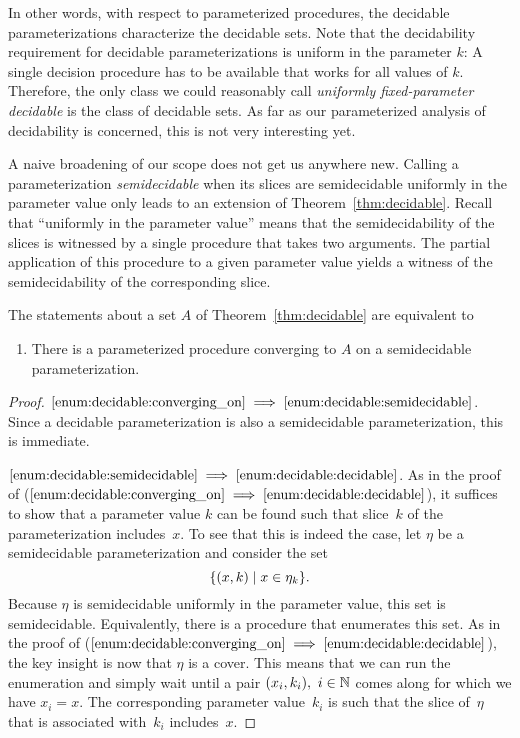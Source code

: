 In other words, with respect to parameterized procedures, the decidable parameterizations characterize the decidable sets.
Note that the decidability requirement for decidable parameterizations is uniform in the parameter $k$:
A single decision procedure has to be available that works for all values of $k$.
Therefore, the only class we could reasonably call \emph{uniformly fixed-parameter decidable} is the class of decidable sets.
As far as our parameterized analysis of decidability is concerned, this is not very interesting yet.

A naive broadening of our scope does not get us anywhere new.
Calling a parameterization \emph{semidecidable} when its slices are semidecidable uniformly in the parameter value only leads to an extension of Theorem~\ref{thm:decidable}.
Recall that \enquote{uniformly in the parameter value} means that the semidecidability of the slices is witnessed by a single procedure that takes two arguments.
The partial application of this procedure to a given parameter value yields a witness of the semidecidability of the corresponding slice.
\begin{theorem}
  The statements about a set $A$ of Theorem~\ref{thm:decidable} are equivalent to
  \begin{enumerate}
  \item\label{enum:decidable:semidecidable}
    There is a parameterized procedure converging to $A$ on a semidecidable parameterization.
  \end{enumerate}
\end{theorem}
\begin{proof}
$\ref{enum:decidable:converging_on} \implies \ref{enum:decidable:semidecidable}$.
  Since a decidable parameterization is also a semidecidable parameterization, this is immediate.

$\ref{enum:decidable:semidecidable} \implies \ref{enum:decidable:decidable}$.
  As in the proof of ($\ref{enum:decidable:converging_on} \implies \ref{enum:decidable:decidable}$), it suffices to show that a parameter value $k$ can be found such that slice~$k$ of the parameterization includes~$x$.
  To see that this is indeed the case, let $\eta$ be a semidecidable parameterization and consider the set
  \begin{equation*}
    \{(x, k) \;|\; x \in \eta_k\}.
  \end{equation*}
  Because $\eta$ is semidecidable uniformly in the parameter value, this set is semidecidable.
  Equivalently, there is a procedure that enumerates this set.
  As in the proof of ($\ref{enum:decidable:converging_on} \implies \ref{enum:decidable:decidable}$), the key insight is now that $\eta$ is a cover.
  This means that we can run the enumeration and simply wait until a pair $(x_i, k_i),\ i \in \mathbb{N}$ comes along for which we have $x_i = x$.
  The corresponding parameter value~$k_i$ is such that the slice of~$\eta$ that is associated with~$k_i$ includes~$x$.
\end{proof}

